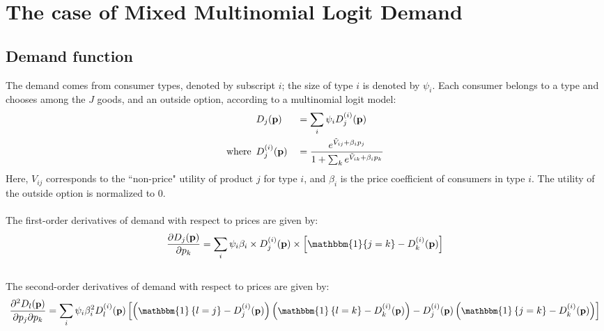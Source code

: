 \documentclass[12pt]{article}
\begin{document}
\section{The case of Mixed Multinomial Logit Demand}

\subsection{Demand function}
The demand comes from consumer types, denoted by subscript $i$; the size of type $i$ is denoted by $\psi_i$. Each consumer belongs to a type and chooses among the $J$ goods, and an outside option, according to a multinomial logit model:
\begin{equation}
\begin{aligned}
	& D_j(\textbf{p}) && = \sum_i \psi_i {D_j^{(i)}(\textbf{p})} \\
	\text{where} \hspace*{5pt} & {D_j^{(i)}(\textbf{p})} && = \frac{e^{ \tilde{V}_{ij}+ \beta_i p_j}}{1 + \sum_k e^{ \tilde{V}_{ik} + \beta_i p_k}}
\end{aligned}
\label{eq:demand}
\end{equation}
Here, $V_{ij}$ corresponds to the ``non-price" utility of product $j$ for type $i$, and $\beta_i$ is the price coefficient of consumers in type $i$. The utility of the outside option is normalized to 0. \\
\\
The first-order derivatives of demand with respect to prices are given by:
\begin{equation}
	\frac{\partial D_j(\textbf{p})}{\partial p_k} = \sum_i \psi_i \beta_i \times D_j^{(i)}(\textbf{p}) \times \left[ \mathbbm{1}\{j=k\} - D_k^{(i)}(\textbf{p}) \right]
 \label{eq:demand_1st_deriv}
\end{equation}
\\
The second-order derivatives of demand with respect to prices are given by:
\begin{equation}
\small
	\frac{\partial^2 D_{l}(\textbf{p})}{\partial p_j \partial p_k} = \sum_i \psi_i \beta_i^2 D^{(i)}_{l}(\textbf{p}) \left[ \left( \mathbbm{1}\left\{ l = j \right\} - D^{(i)}_j(\textbf{p}) \right) \left( \mathbbm{1}\left\{ l = k \right\} - D^{(i)}_k(\textbf{p}) \right) - D^{(i)}_j(\textbf{p}) \left( \mathbbm{1}\left\{ j = k \right\} - D^{(i)}_k(\textbf{p}) \right)  \right]
\label{eq:demand_2nd_derivs}
\end{equation}
\end{document}

